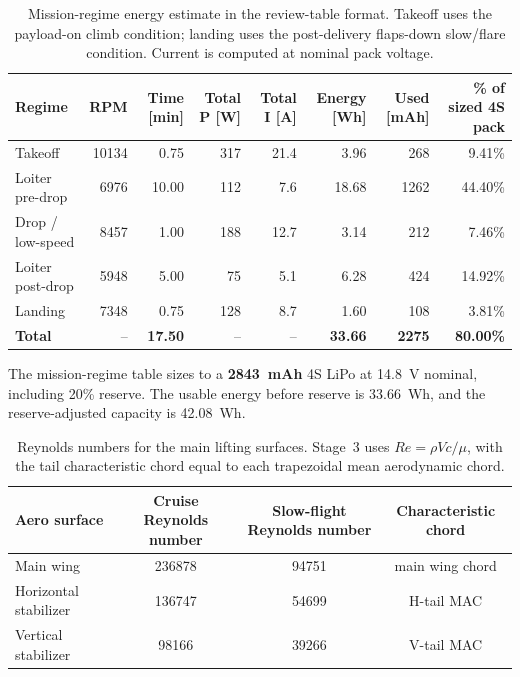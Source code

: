 \documentclass[11pt]{article}
\begin{document}
\begin{table}[H]
\centering
\begin{tabular}{lrrrrrrr}
\toprule
Regime & RPM & Time [min] & Total P [W] & Total I [A] & Energy [Wh] & Used [mAh] & \% of sized 4S pack \\
\midrule
Takeoff & \num{10134} & 0.75 & 317 & 21.4 & 3.96 & 268 & 9.41\% \\
Loiter pre-drop & \num{6976} & 10.00 & 112 & 7.6 & 18.68 & 1262 & 44.40\% \\
Drop / low-speed & \num{8457} & 1.00 & 188 & 12.7 & 3.14 & 212 & 7.46\% \\
Loiter post-drop & \num{5948} & 5.00 & 75 & 5.1 & 6.28 & 424 & 14.92\% \\
Landing & \num{7348} & 0.75 & 128 & 8.7 & 1.60 & 108 & 3.81\% \\
\textbf{Total} & -- & \textbf{17.50} & -- & -- & \textbf{33.66} & \textbf{2275} & \textbf{80.00\%} \\
\bottomrule
\end{tabular}
\caption{Mission-regime energy estimate in the review-table format. Takeoff uses the payload-on climb condition; landing uses the post-delivery flaps-down slow/flare condition. Current is computed at nominal pack voltage.}
\label{tab:stage3-mission-regime-energy}
\end{table}
The mission-regime table sizes to a \textbf{\num{2843}~mAh} 4S LiPo at \SI{14.8}{V} nominal, including 20\% reserve. The usable energy before reserve is \SI{33.66}{Wh}, and the reserve-adjusted capacity is \SI{42.08}{Wh}.

\begin{table}[H]
\centering
\begin{tabular}{lccc}
\toprule
Aero surface & Cruise Reynolds number & Slow-flight Reynolds number & Characteristic chord \\
\midrule
Main wing & \num{236878} & \num{94751} & main wing chord \\
Horizontal stabilizer & \num{136747} & \num{54699} & H-tail MAC \\
Vertical stabilizer & \num{98166} & \num{39266} & V-tail MAC \\
\bottomrule
\end{tabular}
\caption{Reynolds numbers for the main lifting surfaces. Stage~3 uses \(Re=\rho V c/\mu\), with the tail characteristic chord equal to each trapezoidal mean aerodynamic chord.}
\label{tab:stage3-reynolds}
\end{table}
\end{document}
